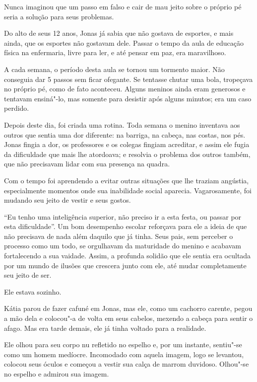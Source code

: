 Nunca imaginou que um passo em falso e cair de mau jeito sobre o próprio
pé seria a solução para seus problemas.

Do alto de seus 12 anos, Jonas já sabia que não gostava de esportes, e
mais ainda, que os esportes não gostavam dele. Passar o tempo da aula de
educação física na enfermaria, livre para ler, e até
pensar em paz, era maravilhoso.

A cada semana, o período desta aula se tornou um tormento maior. Não
conseguia dar 5 passos sem ficar ofegante. Se tentasse chutar uma bola,
tropeçava no próprio pé, como de fato aconteceu. Alguns meninos ainda
eram generosos e tentavam ensiná"-lo, mas somente para desistir após
alguns minutos; era um caso perdido.

Depois deste dia, foi criada uma rotina. Toda semana o menino inventava
aos outros que sentia uma dor diferente: na barriga, na cabeça, nas
costas, nos pés. Jonas fingia a dor, os professores e os colegas fingiam
acreditar, e assim ele fugia da dificuldade que mais lhe atordoava; e
resolvia o problema dos outros também, que não precisavam lidar com sua
presença na quadra.

Com o tempo foi aprendendo a evitar outras situações que lhe traziam
angústia, especialmente momentos onde sua inabilidade social aparecia.
Vagarosamente, foi mudando seu jeito de vestir e seus gostos.

``Eu tenho uma inteligência superior, não preciso ir a esta festa, ou
passar por esta dificuldade''. Um bom desempenho escolar reforçava para
ele a ideia de que não precisava de nada além daquilo que já tinha. Seus
pais, sem perceber o processo como um todo, se orgulhavam da maturidade
do menino e acabavam fortalecendo a sua vaidade. Assim, a profunda
solidão que ele sentia era ocultada por um mundo de ilusões que crescera
junto com ele, até mudar completamente seu jeito de ser.

Ele estava sozinho.

\asterisc

Kátia parou de fazer cafuné em Jonas, mas ele, como um cachorro carente,
pegou a mão dela e colocou"-a de volta em seus cabelos, mexendo a cabeça
para sentir o afago. Mas era tarde demais, ele já tinha voltado para a
realidade.

Ele olhou para seu corpo nu refletido no espelho e, por um instante,
sentiu"-se como um homem medíocre. Incomodado com aquela imagem, logo se
levantou, colocou seus óculos e começou a vestir sua calça de marrom
duvidoso. Olhou"-se no espelho e admirou sua imagem.

